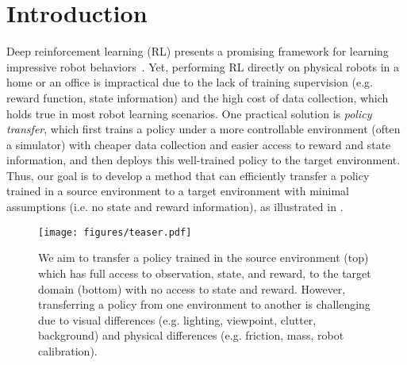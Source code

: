 \section{Introduction}

Deep reinforcement learning (RL) presents a promising framework for learning impressive robot behaviors~\citep{levine2016end, suarez2016framework, rajeswaran2018learning, jain2019learning, lee2021ikea}. Yet, performing RL directly on physical robots in a home or an office is impractical due to the lack of training supervision (e.g. reward function, state information) and the high cost of data collection, which holds true in most robot learning scenarios. 
One practical solution is \textit{policy transfer}, which first trains a policy under a more controllable environment (often a simulator) with cheaper data collection and easier access to reward and state information, and then deploys this well-trained policy to the target environment.  
Thus, our goal is to develop a method that can efficiently transfer a policy trained in a source environment to a target environment with minimal assumptions (i.e. no state and reward information), as illustrated in .


\begin{figure}[t]
    \centering
    \texttt{[image: figures/teaser.pdf]}
    \caption{
        We aim to transfer a policy trained in the source environment (top) which has full access to observation, state, and reward, to the target domain (bottom) with no access to state and reward. However, transferring a policy from one environment to another is challenging due to visual differences (e.g. lighting, viewpoint, clutter, background) and physical differences (e.g. friction, mass, robot calibration).      
    }
    \label{fig:teaser}
\end{figure}


